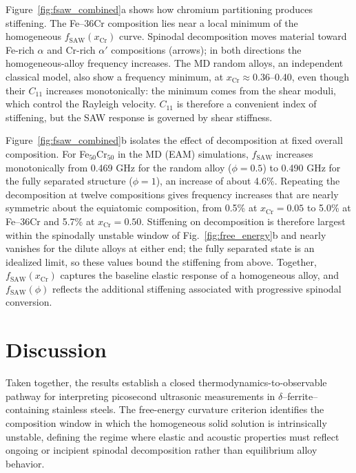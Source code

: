 \documentclass[final,3p,times]{elsarticle}
\begin{document}
Figure~\ref{fig:fsaw_combined}a shows how chromium partitioning produces stiffening. The Fe--36Cr composition lies near a local minimum of the homogeneous $f_{\mathrm{SAW}}(x_{\mathrm{Cr}})$ curve. Spinodal decomposition moves material toward Fe-rich $\alpha$ and Cr-rich $\alpha'$ compositions (arrows); in both directions the homogeneous-alloy frequency increases. The MD random alloys, an independent classical model, also show a frequency minimum, at $x_{\mathrm{Cr}}\approx0.36$--0.40, even though their $C_{11}$ increases monotonically: the minimum comes from the shear moduli, which control the Rayleigh velocity. $C_{11}$ is therefore a convenient index of stiffening, but the SAW response is governed by shear stiffness.

Figure~\ref{fig:fsaw_combined}b isolates the effect of decomposition at fixed overall composition. For Fe$_{50}$Cr$_{50}$ in the MD (EAM) simulations, $f_{\mathrm{SAW}}$ increases monotonically from 0.469 GHz for the random alloy ($\phi=0.5$) to 0.490 GHz for the fully separated structure ($\phi=1$), an increase of about 4.6\%. Repeating the decomposition at twelve compositions gives frequency increases that are nearly symmetric about the equiatomic composition, from 0.5\% at $x_{\mathrm{Cr}}=0.05$ to 5.0\% at Fe--36Cr and 5.7\% at $x_{\mathrm{Cr}}=0.50$. Stiffening on decomposition is therefore largest within the spinodally unstable window of Fig.~\ref{fig:free_energy}b and nearly vanishes for the dilute alloys at either end; the fully separated state is an idealized limit, so these values bound the stiffening from above. Together, $f_{\mathrm{SAW}}(x_{\mathrm{Cr}})$ captures the baseline elastic response of a homogeneous alloy, and $f_{\mathrm{SAW}}(\phi)$ reflects the additional stiffening associated with progressive spinodal conversion.


\section{Discussion}

Taken together, the results establish a closed thermodynamics-to-observable pathway for interpreting picosecond ultrasonic measurements in $\delta$--ferrite--containing stainless steels. The free-energy curvature criterion identifies the composition window in which the homogeneous solid solution is intrinsically unstable, defining the regime where elastic and acoustic properties must reflect ongoing or incipient spinodal decomposition rather than equilibrium alloy behavior.
\end{document}
